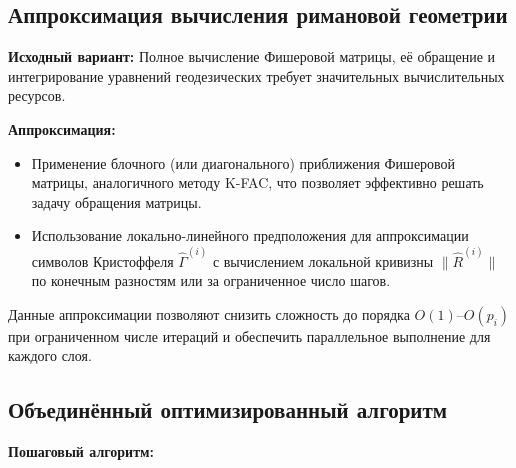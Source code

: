\documentclass[a4paper,12pt]{article}
\begin{document}
\subsection*{Аппроксимация вычисления римановой геометрии}

\textbf{Исходный вариант:} Полное вычисление Фишеровой матрицы, её обращение и интегрирование уравнений геодезических требует значительных вычислительных ресурсов.

\textbf{Аппроксимация:}
\begin{itemize}
    \item Применение блочного (или диагонального) приближения Фишеровой матрицы, аналогичного методу K-FAC, что позволяет эффективно решать задачу обращения матрицы.
    \item Использование локально-линейного предположения для аппроксимации символов Кристоффеля \(\hat{\Gamma}^{(i)}\) с вычислением локальной кривизны \(\| \hat{R}^{(i)} \|\) по конечным разностям или за ограниченное число шагов.
\end{itemize}
Данные аппроксимации позволяют снизить сложность до порядка \( O(1) \)–\( O(p_i) \) при ограниченном числе итераций и обеспечить параллельное выполнение для каждого слоя.

\subsection*{Объединённый оптимизированный алгоритм}

\textbf{Пошаговый алгоритм:}
\end{document}
